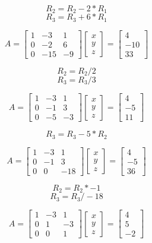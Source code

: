\begin{enumerate}
{  $$R_2 = R_2 - 2*R_1$$
  $$R_3 = R_3 + 6*R_1$$

  $$A = \begin{bmatrix} 1 & -3 & 1 \\ 0 & -2 & 6 \\ 0 & -15 & -9 \end{bmatrix} \begin{bmatrix} x \\ y \\ z \end{bmatrix} = \begin{bmatrix} 4 \\ -10 \\ 33 \end{bmatrix}$$

  $$R_2 = R_2/2$$
  $$R_3 = R_3/3$$
  
  $$A = \begin{bmatrix} 1 & -3 & 1 \\ 0 & -1 & 3 \\ 0 & -5 & -3 \end{bmatrix} \begin{bmatrix} x \\ y \\ z \end{bmatrix} = \begin{bmatrix} 4 \\ -5 \\ 11 \end{bmatrix}$$

  $$R_3 = R_3 - 5*R_2$$

  $$A = \begin{bmatrix} 1 & -3 & 1 \\ 0 & -1 & 3 \\ 0 & 0 & -18 \end{bmatrix} \begin{bmatrix} x \\ y \\ z \end{bmatrix} = \begin{bmatrix} 4 \\ -5 \\ 36 \end{bmatrix}$$

  $$R_2 = R_2 * -1$$
  $$R_3 = R_3 / -18$$

  $$A = \begin{bmatrix} 1 & -3 & 1 \\ 0 & 1 & -3 \\ 0 & 0 & 1 \end{bmatrix} \begin{bmatrix} x \\ y \\ z \end{bmatrix} = \begin{bmatrix} 4 \\ 5 \\ -2 \end{bmatrix}$$

}
\end{enumerate}

